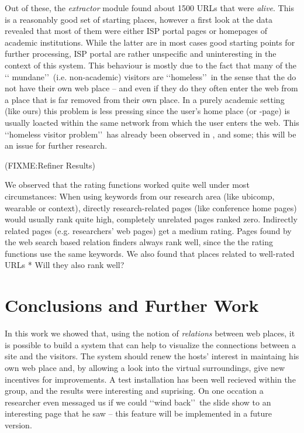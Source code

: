\documentclass[a4paper]{danarticle}
\begin{document}
      Out of these, the \textit{extractor} module found about 1500 URLs that
      were \textit{alive}. This is a reasonably good set of starting places,
      however a first look at the data revealed that most of them were either
      ISP portal pages or homepages of academic institutions. While the latter
      are in most cases good starting points for further processing, ISP portal
      are rather unspecific and uninteresting in the context of this system.
      This behaviour is mostly due to the fact that many of the \lq\lq
      mundane\rq\rq\ (i.e. non-academic) visitors are \lq\lq homeless\rq\rq\ in
      the sense that the do not have their own web place -- and even if they do
      they often enter the web from a place that is far removed from their own
      place. In a purely academic setting (like ours) this problem is less
      pressing since the user's home place (or -page) is usually loacted within
      the same network from which the user enters the web. This \lq\lq homeless
      visitor problem\rq\rq\ has already been observed in \cite{webaware}, and 
      some; this will be an issue for further research.
      
      (FIXME:Refiner Results)
      
      We observed that the rating functions worked quite well under most 
      circumstances: When using keywords from our research area (like ubicomp, 
      wearable or context), directly research-related pages (like conference 
      home pages) would usually rank quite high, completely unrelated pages 
      ranked zero. Indirectly related pages (e.g. researchers' web pages)
      get a medium rating. Pages found by the web search based relation finders 
      always rank well, since the the rating functions use the same keywords. We 
      also found that places related to well-rated URLs 
      * Will they also rank well?
  \section{Conclusions and Further Work}
    In this work we showed that, using the notion of \textit{relations} between
    web places, it is possible to build a system that can help to visualize the
    connections between a site and the visitors. The system should
    renew the hosts' interest in maintaing his own web place and, by allowing a
    look into the virtual surroundings, give new incentives for improvements. A
    test installation has been well recieved within the group, and the results
    were interesting and suprising. On one occation a researcher even messaged us
    if we could \lq\lq wind back\rq\rq\ the slide show to an interesting page
    that he saw -- this feature will be implemented in a future version.
    
\end{document}
